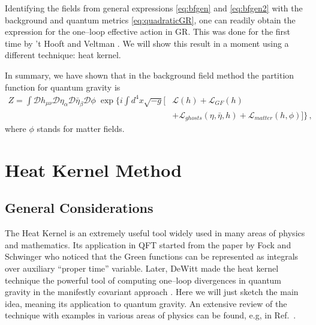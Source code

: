 \documentclass[12pt]{article}
\newcommand{\be}{\begin{equation}}
\newcommand{\ee}{\end{equation}}
\newcommand\m{\mu}
\newcommand\D{\Delta}
\newcommand\n{\nu}
\renewcommand\a{\alpha}
\renewcommand\b{\beta}
\renewcommand{\D}{\mathcal{D}}
\begin{document}
Identifying the fields from general expressions \eqref{eq:bfgen} and \eqref{eq:bfgen2}
with the background and quantum metrics \eqref{eq:quadraticGR}, one can readily obtain
the expression for the one--loop effective action in GR. This was done for the first time by 't Hooft and Veltman \cite{'tHooft:1974bx}. We will show this result in a moment using a different technique: heat kernel.

In summary, we have shown that in the background field method the partition function
for quantum gravity is
\be
\begin{split}
Z=\int \D h_{\m\n} \D \eta_\a \D \bar \eta_\b \D\phi \; \exp\Big\{i\int d^4x \sqrt{-g}[ & \mathcal{L}(h)+\mathcal{L}_{GF}(h)\\
&+\mathcal{L}_{ghosts}(\eta, \bar \eta , h)+\mathcal{L}_{matter}(h , \phi)]\Big\} \,,
\end{split}
\ee
where $\phi$ stands for matter fields.

\section{Heat Kernel Method}
\label{sec:heat}

\subsection{General Considerations}

The Heat Kernel is an extremely useful tool widely used in many areas of physics and mathematics. Its application in QFT started from the paper by Fock \cite{Fock:2004mm} and Schwinger \cite{Schwinger:1951nm} who noticed that the Green functions can be represented as integrals over auxiliary ``proper time'' variable. Later, DeWitt made the heat kernel technique the powerful tool of computing one--loop divergences in quantum gravity in the manifestly covariant approach \cite{DeWitt:1965jb}. Here we will just sketch the main idea, meaning its application to quantum gravity. An extensive review of the technique with examples in various areas of physics can be found, e.g, in Ref.~\cite{Vassilevich:2003xt}.
\end{document}
